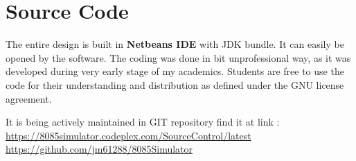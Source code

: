 \section{Source Code}
The entire design is built in \textbf{Netbeans IDE} with JDK bundle. It can easily be opened by the software. The coding was done in bit unprofessional way, as it was developed during very early stage of my academics. Students are free to use the code for their understanding and distribution as defined under the GNU license agreement. 


It is being actively maintained in GIT repository find it at link :\\
\url{https://8085simulator.codeplex.com/SourceControl/latest}\\
\url{https://github.com/jm61288/8085Simulator}

